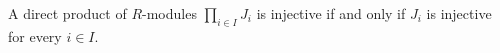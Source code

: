 A direct product of $R$-modules $\prod_{i \in I} J_i$ is injective if and only if $J_i$ is injective for every $i \in I$.
